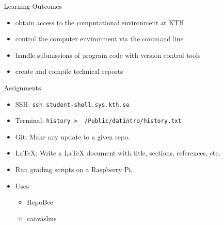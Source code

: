 \begin{frame}[fragile]
  \begin{block}{Learning Outcomes}
    \begin{itemize}
      \item<1> obtain access to the computational environment at KTH
      \item<2> control the computer environment via the command line
      \item<3> handle submissions of program code with version control tools
      \item<4> create and compile technical reports
    \end{itemize}
  \end{block}

  \begin{block}{Assignments}
    \begin{itemize}
      \item<1> SSH: \texttt{ssh student-shell.sys.kth.se}
      \item<2> Terminal: \texttt{history > ~/Public/datintro/history.txt}
      \item<3> Git: Make any update to a given repo.
      \item<4> LaTeX: Write a LaTeX document with title, sections, references, 
        etc.
    \end{itemize}
  \end{block}
\end{frame}

\begin{frame}[fragile]
  \begin{example}[Grading]
    \begin{itemize}
      \item Run grading scripts on a Raspberry Pi.
      \item Uses
        \begin{itemize}
          \item RepoBee
          \item canvaslms
        \end{itemize}
    \end{itemize}
  \end{example}
\end{frame}

